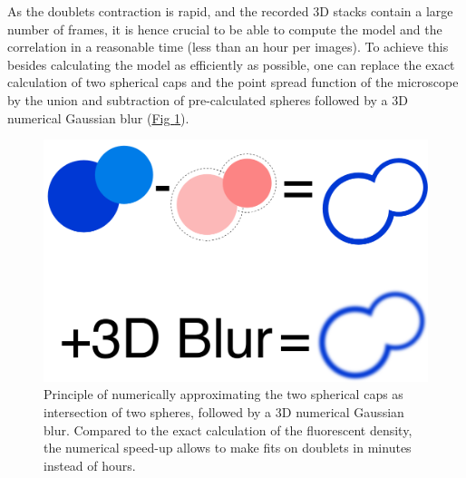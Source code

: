 \documentclass[A4paperpaper,11pt,english]{sphinxmanual}
\begin{document}
As the doublets contraction is rapid, and the recorded 3D stacks contain a
large number of frames, it is hence crucial to be able to compute the model and the
correlation in a reasonable time (less than an hour per images). To
achieve this besides calculating the model as efficiently as possible, one can
replace the exact calculation of two spherical caps and the point spread
function of the microscope by the union and subtraction of pre-calculated spheres followed by a 3D
numerical Gaussian blur (\hyperref[index-latex:fig-mdl]{Fig  \ref*{index-latex:fig-mdl}}).
\begin{figure}[htbp]
\centering
\capstart

\includegraphics[width=0.600\linewidth]{3dblur.png}
\caption{Principle of numerically approximating the two spherical caps as intersection of two spheres,
followed by a 3D numerical Gaussian blur. Compared to the exact calculation of the fluorescent density, the numerical speed-up allows
to make fits on doublets in minutes instead of hours.}\label{index-latex:fig-mdl}\end{figure}
\end{document}
